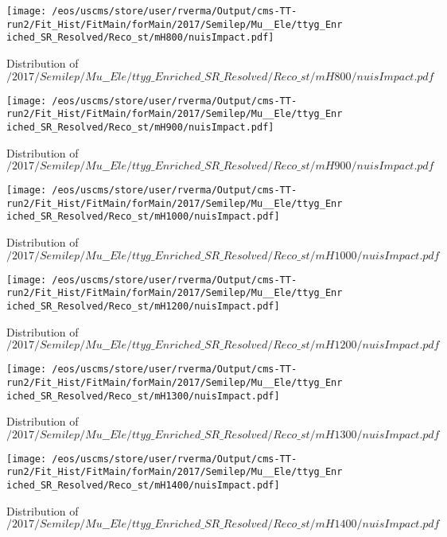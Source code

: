 \begin{figure}
\centering
\texttt{[image: /eos/uscms/store/user/rverma/Output/cms-TT-run2/Fit\_Hist/FitMain/forMain/2017/Semilep/Mu\_\_Ele/ttyg\_Enriched\_SR\_Resolved/Reco\_st/mH800/nuisImpact.pdf]}
\caption{Distribution of $/2017/Semilep/Mu\_\_Ele/ttyg\_Enriched\_SR\_Resolved/Reco\_st/mH800/nuisImpact.pdf$}
\end{figure}

\begin{figure}
\centering
\texttt{[image: /eos/uscms/store/user/rverma/Output/cms-TT-run2/Fit\_Hist/FitMain/forMain/2017/Semilep/Mu\_\_Ele/ttyg\_Enriched\_SR\_Resolved/Reco\_st/mH900/nuisImpact.pdf]}
\caption{Distribution of $/2017/Semilep/Mu\_\_Ele/ttyg\_Enriched\_SR\_Resolved/Reco\_st/mH900/nuisImpact.pdf$}
\end{figure}

\begin{figure}
\centering
\texttt{[image: /eos/uscms/store/user/rverma/Output/cms-TT-run2/Fit\_Hist/FitMain/forMain/2017/Semilep/Mu\_\_Ele/ttyg\_Enriched\_SR\_Resolved/Reco\_st/mH1000/nuisImpact.pdf]}
\caption{Distribution of $/2017/Semilep/Mu\_\_Ele/ttyg\_Enriched\_SR\_Resolved/Reco\_st/mH1000/nuisImpact.pdf$}
\end{figure}

\begin{figure}
\centering
\texttt{[image: /eos/uscms/store/user/rverma/Output/cms-TT-run2/Fit\_Hist/FitMain/forMain/2017/Semilep/Mu\_\_Ele/ttyg\_Enriched\_SR\_Resolved/Reco\_st/mH1200/nuisImpact.pdf]}
\caption{Distribution of $/2017/Semilep/Mu\_\_Ele/ttyg\_Enriched\_SR\_Resolved/Reco\_st/mH1200/nuisImpact.pdf$}
\end{figure}

\begin{figure}
\centering
\texttt{[image: /eos/uscms/store/user/rverma/Output/cms-TT-run2/Fit\_Hist/FitMain/forMain/2017/Semilep/Mu\_\_Ele/ttyg\_Enriched\_SR\_Resolved/Reco\_st/mH1300/nuisImpact.pdf]}
\caption{Distribution of $/2017/Semilep/Mu\_\_Ele/ttyg\_Enriched\_SR\_Resolved/Reco\_st/mH1300/nuisImpact.pdf$}
\end{figure}

\begin{figure}
\centering
\texttt{[image: /eos/uscms/store/user/rverma/Output/cms-TT-run2/Fit\_Hist/FitMain/forMain/2017/Semilep/Mu\_\_Ele/ttyg\_Enriched\_SR\_Resolved/Reco\_st/mH1400/nuisImpact.pdf]}
\caption{Distribution of $/2017/Semilep/Mu\_\_Ele/ttyg\_Enriched\_SR\_Resolved/Reco\_st/mH1400/nuisImpact.pdf$}
\end{figure}

